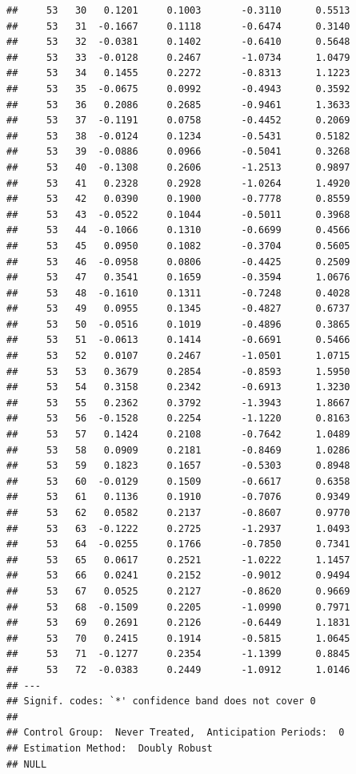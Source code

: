 \documentclass[
]{article}
\begin{document}
\begin{verbatim}
##     53   30   0.1201     0.1003       -0.3110      0.5513 
##     53   31  -0.1667     0.1118       -0.6474      0.3140 
##     53   32  -0.0381     0.1402       -0.6410      0.5648 
##     53   33  -0.0128     0.2467       -1.0734      1.0479 
##     53   34   0.1455     0.2272       -0.8313      1.1223 
##     53   35  -0.0675     0.0992       -0.4943      0.3592 
##     53   36   0.2086     0.2685       -0.9461      1.3633 
##     53   37  -0.1191     0.0758       -0.4452      0.2069 
##     53   38  -0.0124     0.1234       -0.5431      0.5182 
##     53   39  -0.0886     0.0966       -0.5041      0.3268 
##     53   40  -0.1308     0.2606       -1.2513      0.9897 
##     53   41   0.2328     0.2928       -1.0264      1.4920 
##     53   42   0.0390     0.1900       -0.7778      0.8559 
##     53   43  -0.0522     0.1044       -0.5011      0.3968 
##     53   44  -0.1066     0.1310       -0.6699      0.4566 
##     53   45   0.0950     0.1082       -0.3704      0.5605 
##     53   46  -0.0958     0.0806       -0.4425      0.2509 
##     53   47   0.3541     0.1659       -0.3594      1.0676 
##     53   48  -0.1610     0.1311       -0.7248      0.4028 
##     53   49   0.0955     0.1345       -0.4827      0.6737 
##     53   50  -0.0516     0.1019       -0.4896      0.3865 
##     53   51  -0.0613     0.1414       -0.6691      0.5466 
##     53   52   0.0107     0.2467       -1.0501      1.0715 
##     53   53   0.3679     0.2854       -0.8593      1.5950 
##     53   54   0.3158     0.2342       -0.6913      1.3230 
##     53   55   0.2362     0.3792       -1.3943      1.8667 
##     53   56  -0.1528     0.2254       -1.1220      0.8163 
##     53   57   0.1424     0.2108       -0.7642      1.0489 
##     53   58   0.0909     0.2181       -0.8469      1.0286 
##     53   59   0.1823     0.1657       -0.5303      0.8948 
##     53   60  -0.0129     0.1509       -0.6617      0.6358 
##     53   61   0.1136     0.1910       -0.7076      0.9349 
##     53   62   0.0582     0.2137       -0.8607      0.9770 
##     53   63  -0.1222     0.2725       -1.2937      1.0493 
##     53   64  -0.0255     0.1766       -0.7850      0.7341 
##     53   65   0.0617     0.2521       -1.0222      1.1457 
##     53   66   0.0241     0.2152       -0.9012      0.9494 
##     53   67   0.0525     0.2127       -0.8620      0.9669 
##     53   68  -0.1509     0.2205       -1.0990      0.7971 
##     53   69   0.2691     0.2126       -0.6449      1.1831 
##     53   70   0.2415     0.1914       -0.5815      1.0645 
##     53   71  -0.1277     0.2354       -1.1399      0.8845 
##     53   72  -0.0383     0.2449       -1.0912      1.0146 
## ---
## Signif. codes: `*' confidence band does not cover 0
## 
## Control Group:  Never Treated,  Anticipation Periods:  0
## Estimation Method:  Doubly Robust
## NULL
\end{verbatim}
\end{document}
